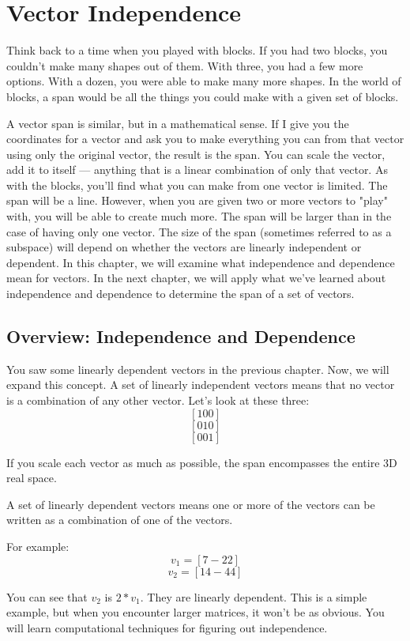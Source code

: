 \chapter{Vector Independence}
Think back to a time when you played with blocks. If you had two blocks, you 
couldn't make many shapes out of them. With three, you had a few more options. 
With a dozen, you were able to make many more shapes. In the world of blocks, 
a span would be all the things you could make with a given set of blocks. 

A vector span is similar, but in a mathematical sense. If I give you the 
coordinates for a vector and ask you to make everything you can from that 
vector using only the original vector, the result is the span. You can scale 
the vector, add it to itself --- anything that is a linear combination of only 
that vector. As with the blocks, you'll find what you can make from one vector 
is limited. The span will be a line. However, when you are given two or more 
vectors to "play" with, you will be able to create much more. The span will be 
larger than in the case of having only one vector. The size of the span 
(sometimes referred to as a subspace) will depend on whether the vectors are 
linearly independent or dependent. In this chapter, we will examine what 
independence and dependence mean for vectors. In the next chapter, we will 
apply what we've learned about independence and dependence to determine the 
span of a set of vectors. 

\section{Overview: Independence and Dependence}
You saw some linearly dependent vectors in the previous chapter. Now, we will 
expand this concept. A set of linearly independent vectors means that no 
vector is a combination of any other vector. Let's look at these three:
$$[1 0 0]$$
$$[0 1 0]$$
$$[0 0 1]$$

If you scale each vector as much as possible, the span encompasses the entire 
3D real space. 

A set of linearly dependent vectors means one or more of the vectors can be 
written as a combination of one of the vectors.

For example:
$$v_1 = [7 -2 2]$$
$$v_2 = [14 -4 4]$$

You can see that $v_2$ is $2*v_1$. They are linearly dependent. This is a 
simple example, but when you encounter larger matrices, it won't be as obvious. 
You will learn computational techniques for figuring out independence.

